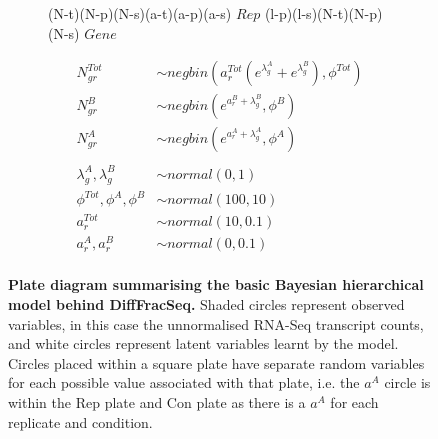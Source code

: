 \documentclass[../main.tex]{subfiles}
\begin{document}
\begin{figure} [t!]
\begin{subfigure}[b]{0.4\textwidth}
{        %
         {(N-t)(N-p)(N-s)(a-t)(a-p)(a-s)} {$Rep$}
         {(l-p)(l-s)(N-t)(N-p)(N-s)} {$Gene$}
    }
    \end{subfigure}
     \hfill
     \begin{subfigure}[b]{0.5\textwidth}
     \centering
     \begin{align*}
        N^{Tot}_{gr} & \sim  negbin(a^{Tot}_{r}(e^{\lambda^{A}_{g}} + e^{\lambda^{B}_{g}}), \phi^{Tot})\\
        N^{B}_{gr} & \sim  negbin(e^{a^{B}_{r}+\lambda^{B}_{g}}, \phi^{B})\\
        N^{A}_{gr} & \sim  negbin(e^{a^{A}_{r}+\lambda^{A}_{g}}, \phi^{A})\\
        \\
        \lambda^{A}_{g}, \lambda^{B}_{g} &\sim normal(0, 1)\\
        \phi^{Tot}, \phi^{A}, \phi^{B}&\sim normal(100,10)\\
        a^{Tot}_{r}&\sim normal(10, 0.1)\\
        a^{A}_{r}, a^{B}_{r}&\sim normal(0, 0.1)\\
    \end{align*}
     \end{subfigure}
     \caption[Graphical representation of the DiffFracSeq Model.]{\textbf{Plate diagram summarising the basic Bayesian hierarchical model behind DiffFracSeq.} Shaded circles represent observed variables, in this case the unnormalised RNA-Seq transcript counts, and white circles represent latent variables learnt by the model. Circles placed within a square plate have separate random variables for each possible value associated with that plate, i.e. the $a^{A}$ circle is within the Rep plate and Con plate as there is a $a^{A}$ for each replicate and condition.}
     \label{fig:DiffFracQuant-plate-diagram}
\end{figure}
\end{document}
